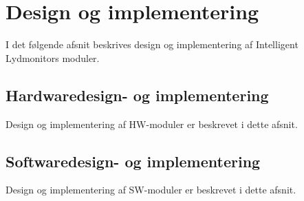\newpage
\section{Design og implementering}
I det følgende afsnit beskrives design og implementering af Intelligent Lydmonitors moduler.

\subsection{Hardwaredesign- og implementering}
Design og implementering af HW-moduler er beskrevet i dette afsnit.






\newpage
\subsection{Softwaredesign- og implementering}
Design og implementering af SW-moduler er beskrevet i dette afsnit.








